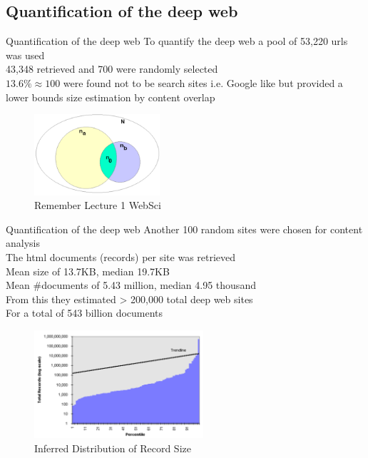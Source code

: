 \documentclass{beamer}
\begin{document}
\subsection{Quantification of the deep web}
\begin{frame}[fragile]{Quantification of the deep web}
To quantify the deep web a pool of 53,220 urls was used \\  
 43,348 retrieved and 700 were randomly selected \\
$13.6\% \approx 100$ were found not to be search sites i.e. Google like
but provided a lower bounds size estimation by content overlap
\begin{figure}
			\includegraphics[height=3cm]{overlapAnalysis.png}
			\caption{Remember Lecture 1 WebSci}
	\end{figure}
\end{frame}
\begin{frame}[fragile]{Quantification of the deep web}
Another 100 random sites were chosen for content analysis \\
The html documents (records) per site was retrieved  \\
Mean size of 13.7KB, median 19.7KB  \\
Mean \#documents of 5.43 million, median 4.95 thousand \\
From this they estimated > 200,000 total deep web sites \\
For a total of 543 billion documents 
\begin{figure}
			\includegraphics[height=4cm]{inferedDWRecSize.png}
			\caption{ \footnotesize{Inferred Distribution of Record Size}}
	\end{figure}
\end{frame}
\end{document}
